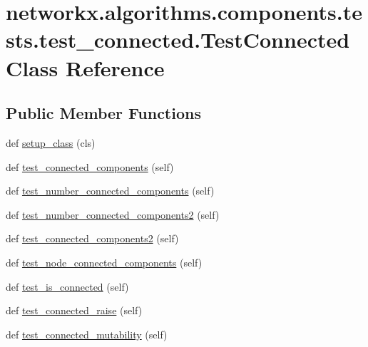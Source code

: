 \hypertarget{classnetworkx_1_1algorithms_1_1components_1_1tests_1_1test__connected_1_1TestConnected}{}\section{networkx.\+algorithms.\+components.\+tests.\+test\+\_\+connected.\+Test\+Connected Class Reference}
\label{classnetworkx_1_1algorithms_1_1components_1_1tests_1_1test__connected_1_1TestConnected}
\subsection*{Public Member Functions}
\begin{DoxyCompactItemize}
\item 
def \hyperlink{classnetworkx_1_1algorithms_1_1components_1_1tests_1_1test__connected_1_1TestConnected_a5fd76241198a37c87ca29771b9c95079}{setup\+\_\+class} (cls)
\item 
def \hyperlink{classnetworkx_1_1algorithms_1_1components_1_1tests_1_1test__connected_1_1TestConnected_a2e4ca4f3369ba3f5863890394b2b6d29}{test\+\_\+connected\+\_\+components} (self)
\item 
def \hyperlink{classnetworkx_1_1algorithms_1_1components_1_1tests_1_1test__connected_1_1TestConnected_a791bc707ebfa79443b5a167852fee28a}{test\+\_\+number\+\_\+connected\+\_\+components} (self)
\item 
def \hyperlink{classnetworkx_1_1algorithms_1_1components_1_1tests_1_1test__connected_1_1TestConnected_ad2931f8081dc8328f9f048e33094c271}{test\+\_\+number\+\_\+connected\+\_\+components2} (self)
\item 
def \hyperlink{classnetworkx_1_1algorithms_1_1components_1_1tests_1_1test__connected_1_1TestConnected_a9e0e5806751735384b89228d120204ea}{test\+\_\+connected\+\_\+components2} (self)
\item 
def \hyperlink{classnetworkx_1_1algorithms_1_1components_1_1tests_1_1test__connected_1_1TestConnected_a1dd28ae9be0cda94ba30f85d5063d8fa}{test\+\_\+node\+\_\+connected\+\_\+components} (self)
\item 
def \hyperlink{classnetworkx_1_1algorithms_1_1components_1_1tests_1_1test__connected_1_1TestConnected_a34fa17bcadd1bbcf0f3e007983e32773}{test\+\_\+is\+\_\+connected} (self)
\item 
def \hyperlink{classnetworkx_1_1algorithms_1_1components_1_1tests_1_1test__connected_1_1TestConnected_af947d6ad48b998ff22e22880ad382494}{test\+\_\+connected\+\_\+raise} (self)
\item 
def \hyperlink{classnetworkx_1_1algorithms_1_1components_1_1tests_1_1test__connected_1_1TestConnected_af51988d9f4ea53eaa93db9f058e2f001}{test\+\_\+connected\+\_\+mutability} (self)
\end{DoxyCompactItemize}
